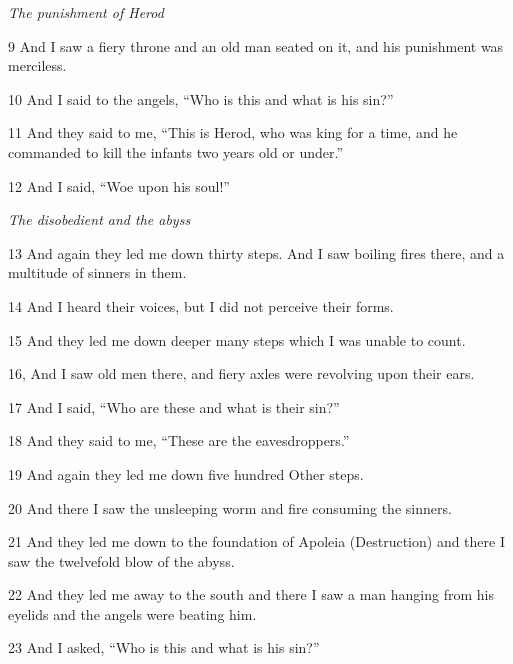 \par \textit{The punishment of Herod}

\par 9 And I saw a fiery throne and an old man seated on it, and his punishment was merciless.

\par 10 And I said to the angels, “Who is this and what is his sin?” 

\par 11 And they said to me, “This is Herod, who was king for a time, and he commanded to kill the infants two years old or under.”

\par 12 And I said, “Woe upon his soul!” 

\par \textit{The disobedient and the abyss}

\par 13 And again they led me down thirty steps. And I saw boiling fires there, and a multitude of sinners in them.

\par 14 And I heard their voices, but I did not perceive their forms.

\par 15 And they led me down deeper many steps which I was unable to count.

\par 16, And I saw old men there, and fiery axles were revolving upon their ears.

\par 17 And I said, “Who are these and what is their sin?”

\par 18 And they said to me, “These are the eavesdroppers.”

\par 19 And again they led me down five hundred Other steps. 

\par 20 And there I saw the unsleeping worm and fire consuming the sinners.

\par 21 And they led me down to the foundation of Apoleia (Destruction) and there I saw the twelvefold blow of the abyss.

\par 22 And they led me away to the south and there I saw a man hanging from his eyelids and the angels were beating him.

\par 23 And I asked, “Who is this and what is his sin?”

